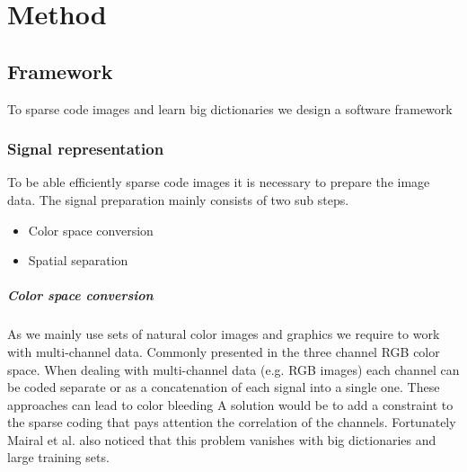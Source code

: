 \chapter{Method}

\section{Framework}
To sparse code images and learn big dictionaries we design a software framework

\subsection{Signal representation}
\label{sec:signal_representation}
To be able efficiently sparse code images it is necessary to prepare the
image data. The signal preparation mainly consists of two sub steps.
\begin{itemize}
 \item Color space conversion
 \item Spatial separation
\end{itemize}

\paragraph{Color space conversion} As we mainly use sets of natural color images
and graphics we require to work with multi-channel data. Commonly presented in
the three channel RGB color space.
When dealing with multi-channel data (e.g. RGB images) each channel can be coded
separate or as a concatenation of each signal into a single one. These
approaches can lead to color bleeding \cite{mairal08sparse} 
A solution would be to add a constraint to the sparse coding that pays attention
the correlation of the channels.  
Fortunately Mairal et al. also noticed that this problem vanishes with big
dictionaries and large training sets.
\cite{mairal08sparse}




